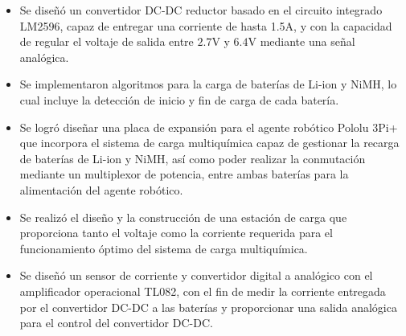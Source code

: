 
\begin{itemize}
    \item Se diseñó un convertidor DC-DC reductor basado en el circuito
    integrado LM2596, capaz de entregar una corriente de hasta 1.5A, y
    con la capacidad de regular el voltaje de salida entre $2.7$V y 
    $6.4$V mediante una señal analógica.

    \item Se implementaron algoritmos para la carga de baterías de Li-ion y
    NiMH, lo cual incluye la detección de inicio y fin de carga de cada
    batería.

    \item Se logró diseñar una placa de expansión para el agente robótico
    Pololu 3Pi+ que incorpora el sistema de carga multiquímica capaz de
    gestionar la recarga de baterías de Li-ion y NiMH,
    así como poder realizar la conmutación mediante un multiplexor de 
    potencia, entre ambas baterías para la 
    alimentación del agente robótico.

    \item Se realizó el diseño y la construcción de una estación de carga
    que proporciona tanto el voltaje como la corriente requerida para el
    funcionamiento óptimo del sistema de carga multiquímica.

    \item Se diseñó un sensor de corriente y convertidor digital a 
    analógico con el amplificador operacional TL082, con el fin de
    medir la corriente entregada por el convertidor DC-DC a las baterías y 
    proporcionar una salida analógica para el control del convertidor DC-DC.


\end{itemize}